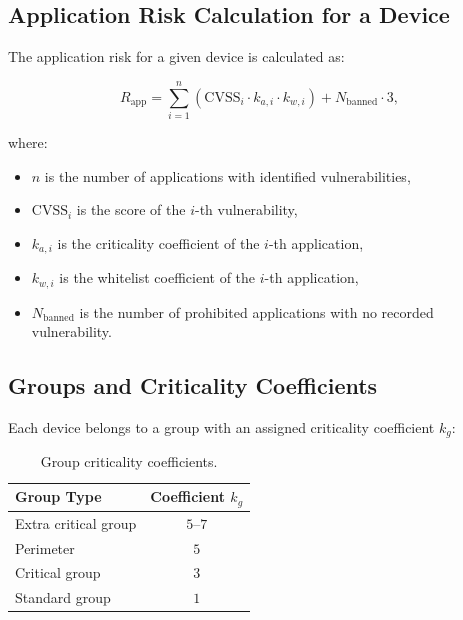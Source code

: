 \subsection{Application Risk Calculation for a Device}

The application risk for a given device is calculated as:

\begin{equation}
    R_{\text{app}} = \sum_{i=1}^{n} \left( \text{CVSS}_i \cdot k_{a,i} \cdot k_{w,i} \right) + N_{\text{banned}} \cdot 3,
    \label{eq:risk_app}
\end{equation}

where:
\begin{itemize}
    \item $n$ is the number of applications with identified vulnerabilities,
    \item $\text{CVSS}_i$ is the score of the $i$-th vulnerability,
    \item $k_{a,i}$ is the criticality coefficient of the $i$-th application,
    \item $k_{w,i}$ is the whitelist coefficient of the $i$-th application,
    \item $N_{\text{banned}}$ is the number of prohibited applications with no recorded vulnerability.
\end{itemize}

\subsection{Groups and Criticality Coefficients}

Each device belongs to a group with an assigned criticality coefficient $k_g$:

\begin{table}[h!]
    \centering
    \begin{tabular}{lc}
        \hline
        \textbf{Group Type} & \textbf{Coefficient $k_g$} \\
        \hline
        Extra critical group & $5$--$7$ \\
        Perimeter            & $5$ \\
        Critical group       & $3$ \\
        Standard group       & $1$ \\
        \hline
    \end{tabular}
    \caption{Group criticality coefficients.}
    \label{tab:group_coeff}
\end{table}

